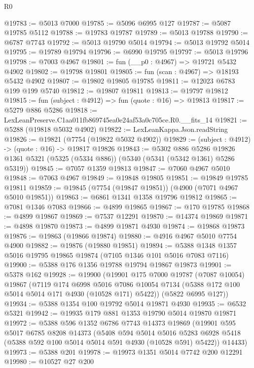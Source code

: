 \begin{lexlean}{R0}
\begin{coremodule}
@19783 := @5013 @7000
@19785 := @5096 @6995 @127
@19787 := @5087 @19785 @5112
@19788 := @19783 @19787
@19789 := @5013 @19788
@19790 := @6787 @7743
@19792 := @5013 @19790 @5014
@19794 := @5013 @19792 @5014
@19795 := @19789 @19794
@19796 := @6990 @19795
@19797 := @5013 @19796
@19798 := @7003 @4967
@19801 := fun (__p0 : @4967) => @19721 @5432 @4902
@19802 := @19798 @19801
@19805 := fun (scan : @4967) => @18193 @5432 @4902
@19807 := @19802 @19805 @19785
@19811 := @12023 @6783 @199 @199 @5740
@19812 := @19807 @19811
@19813 := @19797 @19812
@19815 := fun (subject : @4912) => fun (quote : @16) => @19813
@19817 := @5279 @886 @5286
@19818 := LexLeanPreserve.C1aa011fb869745ea0e24af53a0c705ce.R0.__fits_14
@19821 := @5288 (@19818 @5032 @4902)
@19822 := LexLeanKappa.Json.readString
@19826 := @19821 (@7754 (@19822 @5032 @4902))
@19829 := (subject : @4912) -> (quote : @16) -> @19817 @19826
@19843 := @5302
    @886
    @5286
    @19826
    @1361
    @5321
    (@5325 (@5334 @886))
    (@5340 (@5341 (@5342 @1361) @5286 @5319))
@19845 := @7057 @1359 @19813
@19847 := @7060 @4967 @5010
@19848 := @7063 @4967
@19849 := @19848 @19805
@19851 := @19849 @19785 @19811
@19859 := @19845 (@7754 (@19847 @19851)) (@4900 (@7071 @4967 @5010 @19851))
@19863 := @6861 @1341 @1358 @19796 @19812
@19865 := @7081 @1346 @7083
@19866 := @4899 @19865
@19867 := @170 @19785
@19868 := @4899 @19867
@19869 := @7537 @12291
@19870 := @14374 @19869
@19871 := @4898 @19870
@19873 := @4899 @19871 @4930
@19874 := @19868 @19873
@19876 := @19863 (@19866 @19874)
@19880 := @4916 @4967 @5010 @7754 @4900
@19882 := @19876 (@19880 @19851)
@19894 := @5388 @1348 @1357 @5016 @19795 @19865 @19874 (@7105 @1346 @101 @5016 @7083 @7116)
@19900 := @5388 @176 @1356 @19788 @19794 @19867 @19873
@19901 := @5378 @162
@19928 := @19900
    (@19901
      @175
      @7000
      @19787
      (@7087 @10054)
      @19867
      (@7119
        @174
        @6998
        @5016
        @7086
        @10054
        @7134
        (@5388 @172 @100 @5014 @5014 @171 @4930 (@10528 @171) @5422))
      (@5822 @6995 @127))
@19934 := @5388 @1354 @100 @19792 @5014 @19871 @4930
@19935 := @6532 @5321
@19942 := @19935 @179 @881 @1353 @19790 @5014 @19870 @19871
@19972 := @5388
    @596
    @1352
    @6786
    @7743
    @14373
    @19869
    (@19901
      @595
      @5017
      @6785
      @8208
      @14373
      (@5408
        @594
        @5014
        @5016
        @5283
        @6928
        @5418
        (@5388 @592 @100 @5014 @5014 @591 @4930 (@10528 @591) @5422))
      @14433)
@19973 := @5388 @201
@19978 := @19973 @1351 @5014 @7742 @200 @12291
@19980 := @10527 @27 @200

\end{coremodule}
\end{lexlean}
